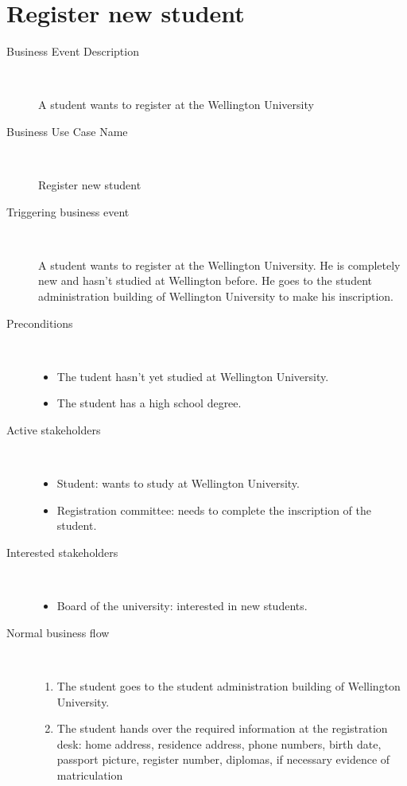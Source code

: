 \section{Register new student}
\label{register-new-student}

\begin{description}
	\item[Business Event Description] \
	\par A student wants to register at the Wellington
	University
	\item[Business Use Case Name] \
	\par Register new student
	\item[Triggering business event] \
	\par A student wants to register at the Wellington
	University. He is completely new and hasn't studied at Wellington before. He
	goes to the student administration building of Wellington University to make
	his inscription.
	\item[Preconditions] \ 
	\begin{itemize}
		\item The tudent hasn't yet studied at Wellington University.
		\item The student has a high school degree.
	\end{itemize}
	\item[Active stakeholders] \ 
	\begin{itemize}
	  	\item Student: wants to study at Wellington University.
		\item Registration committee: needs to complete the inscription of the student.
	\end{itemize}
	\item[Interested stakeholders] \ 
		\begin{itemize}
		  \item Board of the university: interested in new students.
		\end{itemize}
	\item[Normal business flow] \
	\begin{enumerate}
	  	\item The student goes to the student administration building of Wellington
	  	University.
	  	\item The student hands over the required information at the registration
	  	desk: home address, residence address, phone numbers, birth date, passport
	  	picture, register number, diplomas, if necessary evidence of matriculation 

\end{enumerate}
\end{description}

